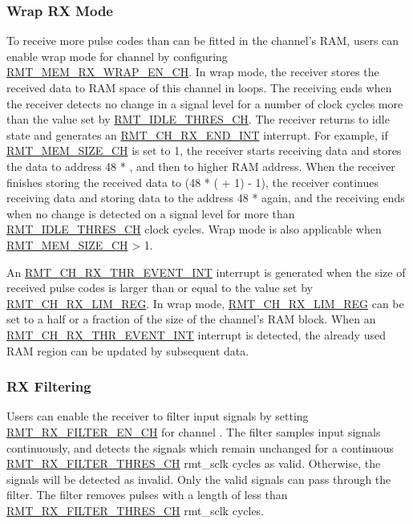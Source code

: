 \documentclass[main\_\_EN.tex]{subfiles}
\begin{document}
\subsubsection{Wrap RX Mode}

To receive more pulse codes than can be fitted in the channel’s RAM, users can enable wrap mode for channel  by configuring \hyperref[fielddesc:RMTMEMRXWRAPENCHM]{RMT\_MEM\_RX\_WRAP\_EN\_CH}. In wrap mode, the receiver stores the received data to RAM space of this channel in loops. The receiving ends when the receiver detects no change in a signal level for a number of clock cycles more than the value set by \hyperref[fielddesc:RMTIDLETHRESCHM]{RMT\_IDLE\_THRES\_CH}. The receiver returns to idle state and generates an \hyperref[int:RMTCHnRXENDINT]{RMT\_CH\_RX\_END\_INT} interrupt. For example, if \hyperref[fielddesc:RMTMEMSIZECHM]{RMT\_MEM\_SIZE\_CH} is set to 1, the receiver starts receiving data and stores the data to address 48 * , and then to higher RAM address. When the receiver finishes storing the received data to (48 * ( + 1) - 1), the receiver continues receiving data and storing data to the address 48 *   again, and the receiving ends when no change is detected on a signal level for more than \hyperref[fielddesc:RMTIDLETHRESCHM]{RMT\_IDLE\_THRES\_CH} clock cycles. Wrap mode is also applicable when \hyperref[fielddesc:RMTMEMSIZECHM]{RMT\_MEM\_SIZE\_CH} > 1.

An \hyperref[int:RMTCHmRXTHREVENTINT]{RMT\_CH\_RX\_THR\_EVENT\_INT} interrupt is generated when the size of received pulse codes is larger than or equal to the value set by \hyperref[fielddesc:RMTCHMRXLIMREG]{RMT\_CH\_RX\_LIM\_REG}.
In wrap mode, \hyperref[fielddesc:RMTCHMRXLIMREG]{RMT\_CH\_RX\_LIM\_REG} can be set to a half or a fraction of the size of the channel’s RAM block.
When an \hyperref[int:RMTCHmRXTHREVENTINT]{RMT\_CH\_RX\_THR\_EVENT\_INT} interrupt is detected, the already used RAM region can be updated by subsequent data.


\subsubsection{RX Filtering}

Users can enable the receiver to filter input signals by setting \hyperref[fielddesc:RMTRXFILTERENCHM]{RMT\_RX\_FILTER\_EN\_CH} for channel . The filter samples input signals continuously, and detects the signals which remain unchanged for a continuous \hyperref[fielddesc:RMTRXFILTERTHRESCHM]{RMT\_RX\_FILTER\_THRES\_CH} rmt\_sclk cycles as valid. Otherwise, the signals will be detected as invalid. Only the valid signals can pass through the filter. The filter removes pulses with a length of less than \hyperref[fielddesc:RMTRXFILTERTHRESCHM]{RMT\_RX\_FILTER\_THRES\_CH} rmt\_sclk cycles.
\end{document}
